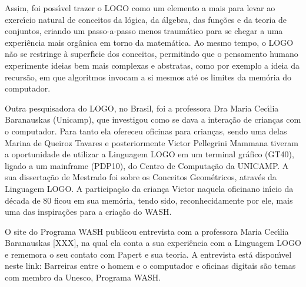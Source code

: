 \documentclass[
12pt,		%
openright,	%
twoside,  %
a4paper,			%
chapter=TITLE,		%
english,			%
french,				%
spanish,			%
brazil				%
]{USPSC-classe/USPSC}
\begin{document}
Assim, foi poss\'{\i}vel trazer o LOGO como um elemento a mais para levar ao exerc\'{\i}cio natural de conceitos da l\'ogica, da \'algebra, das fun\c{c}\~oes e da teoria de conjuntos, criando um passo-a-passo menos traum\'atico para se chegar a uma experi\^encia mais org\^anica em torno da matem\'atica. Ao mesmo tempo, o LOGO n\~ao se restringe \`a superf\'{\i}cie dos conceitos, permitindo que o pensamento humano experimente ideias bem mais complexas e abstratas, como por exemplo a ideia da recurs\~ao, em que algoritmos invocam a si mesmos at\'e os limites da mem\'oria do computador.










Outra pesquisadora do LOGO, no Brasil, foi a professora  Dra Maria Cec\'{\i}lia Baranauskas (Unicamp), que investigou como  se dava a intera\c{c}\~ao de crian\c{c}as com o computador. Para tanto ela ofereceu oficinas para  crian\c{c}as, sendo uma delas Marina de Queiroz Tavares  e posteriormente Victor Pellegrini Mammana  tiveram a oportunidade  de  utilizar a Linguagem LOGO em um terminal gr\'afico (GT40), ligado a um mainframe (PDP10), do Centro de Computa\c{c}\~ao da UNICAMP. A sua disserta\c{c}\~ao de Mestrado foi sobre os \textquotedbl Conceitos Geom\'etricos, atrav\'es da Linguagem LOGO\textquotedbl . A participa\c{c}\~ao da crian\c{c}a Victor naquela \textquotedbl oficina\textquotedbl  no in\'{\i}cio da d\'ecada de 80 ficou em sua mem\'oria, tendo sido, reconhecidamente por ele, mais uma das inspira\c{c}\~oes para a cria\c{c}\~ao do WASH.










O site do Programa WASH publicou entrevista com a professora Maria Cec\'{\i}lia Baranauskas [XXX], na qual ela conta a sua experi\^encia com a Linguagem LOGO e rememora o seu contato com Papert e sua teoria. A entrevista est\'a dispon\'{\i}vel neste link: \textquotedbl Barreiras entre o homem e o computador e oficinas digitais s\~ao temas com membro da Unesco, Programa WASH\textquotedbl .
\end{document}
